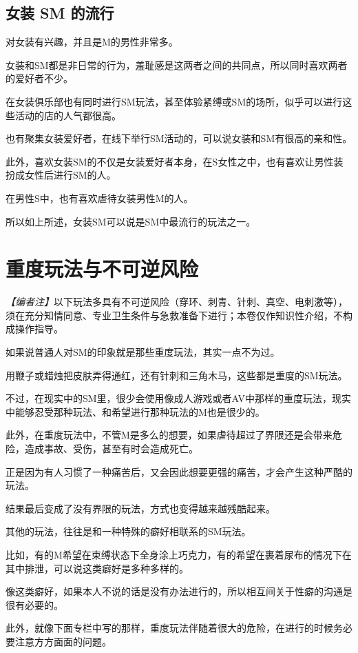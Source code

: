 \documentclass[12pt,UTF8]{ctexbook}
\begin{document}
\subsection{女装 SM 的流行}

对女装有兴趣，并且是M的男性非常多。

女装和SM都是非日常的行为，羞耻感是这两者之间的共同点，所以同时喜欢两者的爱好者不少。

在女装俱乐部也有同时进行SM玩法，甚至体验紧缚或SM的场所，似乎可以进行这些活动的店的人气都很高。

也有聚集女装爱好者，在线下举行SM活动的，可以说女装和SM有很高的亲和性。

此外，喜欢女装SM的不仅是女装爱好者本身，在S女性之中，也有喜欢让男性装扮成女性后进行SM的人。

在男性S中，也有喜欢虐待女装男性M的人。

所以如上所述，女装SM可以说是SM中最流行的玩法之一。

\section{重度玩法与不可逆风险}

\noindent\textit{【编者注】}以下玩法多具有不可逆风险（穿环、刺青、针刺、真空、电刺激等），须在充分知情同意、专业卫生条件与急救准备下进行；本卷仅作知识性介绍，不构成操作指导。

如果说普通人对SM的印象就是那些重度玩法，其实一点不为过。

用鞭子或蜡烛把皮肤弄得通红，还有针刺和三角木马，这些都是重度的SM玩法。

不过，在现实中的SM里，很少会使用像成人游戏或者AV中那样的重度玩法，现实中能够忍受那种玩法、和希望进行那种玩法的M也是很少的。

此外，在重度玩法中，不管M是多么的想要，如果虐待超过了界限还是会带来危险，造成事故、受伤，甚至有时会造成死亡。

正是因为有人习惯了一种痛苦后，又会因此想要更强的痛苦，才会产生这种严酷的玩法。

结果最后变成了没有界限的玩法，方式也变得越来越残酷起来。

其他的玩法，往往是和一种特殊的癖好相联系的SM玩法。

比如，有的M希望在束缚状态下全身涂上巧克力，有的希望在裹着尿布的情况下在其中排泄，可以说这类癖好是多种多样的。

像这类癖好，如果本人不说的话是没有办法进行的，所以相互间关于性癖的沟通是很有必要的。

此外，就像下面专栏中写的那样，重度玩法伴随着很大的危险，在进行的时候务必要注意方方面面的问题。
\end{document}
